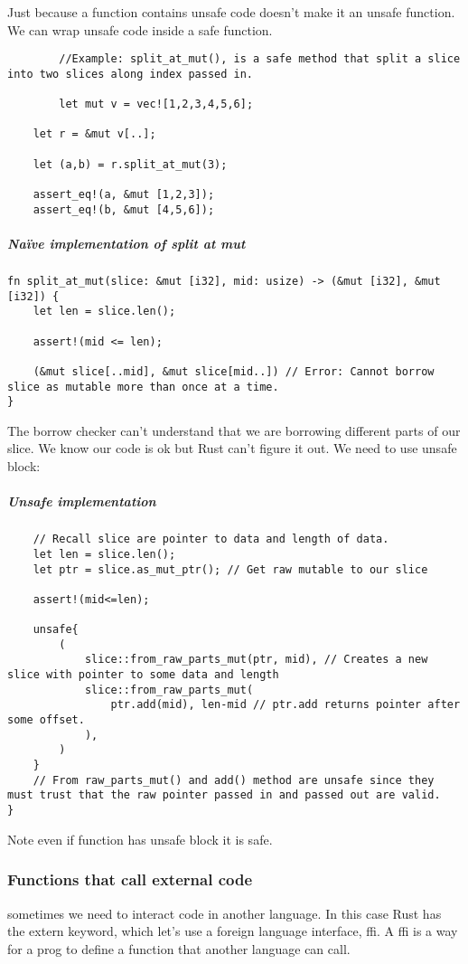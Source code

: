 Just because a function contains unsafe code doesn't make it an unsafe function. We can wrap unsafe code inside a safe function.
    \begin{lstlisting}
        //Example: split_at_mut(), is a safe method that split a slice into two slices along index passed in.
        
        let mut v = vec![1,2,3,4,5,6];

    let r = &mut v[..];

    let (a,b) = r.split_at_mut(3);

    assert_eq!(a, &mut [1,2,3]);
    assert_eq!(b, &mut [4,5,6]);
    \end{lstlisting}
\subparagraph*{Naïve implementation of split at mut}\begin{lstlisting}
fn split_at_mut(slice: &mut [i32], mid: usize) -> (&mut [i32], &mut [i32]) {
    let len = slice.len();

    assert!(mid <= len);

    (&mut slice[..mid], &mut slice[mid..]) // Error: Cannot borrow slice as mutable more than once at a time. 
}
\end{lstlisting}    
The borrow checker can't understand that we are borrowing different parts of our slice. We know our code is ok but Rust can't figure it out. We need to use unsafe block: 
\subparagraph*{Unsafe implementation}\begin{lstlisting}
    // Recall slice are pointer to data and length of data.
    let len = slice.len();
    let ptr = slice.as_mut_ptr(); // Get raw mutable to our slice

    assert!(mid<=len); 

    unsafe{ 
        (
            slice::from_raw_parts_mut(ptr, mid), // Creates a new slice with pointer to some data and length
            slice::from_raw_parts_mut(
                ptr.add(mid), len-mid // ptr.add returns pointer after some offset.
            ),
        )
    }
    // From raw_parts_mut() and add() method are unsafe since they must trust that the raw pointer passed in and passed out are valid.  
}
\end{lstlisting}
Note even if function has unsafe block it is safe.

\subsubsection{Functions that call external code}
sometimes we need to interact code in another language. In this case Rust has the extern keyword, which let's use a foreign language interface, ffi. A ffi is a way for a prog to define a function that another language can call.

